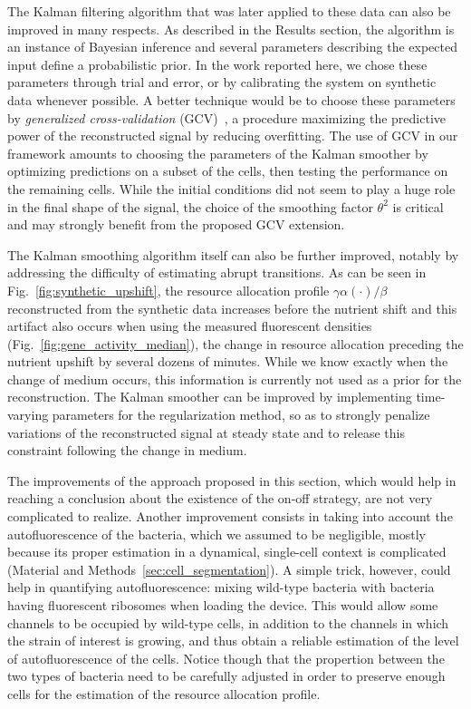 The Kalman filtering algorithm that was later applied to these data can also be improved in many respects.
As described in the Results section, the algorithm is an instance of Bayesian inference and several parameters describing the expected input define a probabilistic prior.
In the work reported here, we chose these parameters through trial and error, or by calibrating the system on synthetic data whenever possible.
A better technique would be to choose these parameters by \textit{generalized cross-validation} (GCV)~\cite{golub_generalized_1979}, a procedure maximizing the predictive power of the reconstructed signal by reducing overfitting.
The use of GCV in our framework amounts to choosing the parameters of the Kalman smoother by optimizing predictions on a subset of the cells, then testing the performance on the remaining cells.
While the initial conditions did not seem to play a huge role in the final shape of the signal, the choice of the smoothing factor $\theta^2$ is critical and may strongly benefit from the proposed GCV extension.

The Kalman smoothing algorithm itself can also be further improved, notably by addressing the difficulty of estimating abrupt transitions.
As can be seen in Fig.~\ref{fig:synthetic_upshift}, the resource allocation profile $\gamma \alpha (\cdot) / \beta$ reconstructed from the synthetic data increases before the nutrient shift and this artifact also occurs when using the measured fluorescent densities (Fig.~\ref{fig:gene_activity_median}), the change in resource allocation preceding the nutrient upshift by several dozens of minutes.
While we know exactly when the change of medium occurs, this information is currently not used as a prior for the reconstruction.
The Kalman smoother can be improved by implementing time-varying parameters for the regularization method, so as to strongly penalize variations of the reconstructed signal at steady state and to release this constraint following the change in medium.

The improvements of the approach proposed in this section, which would help in reaching a conclusion about the existence of the on-off strategy, are not very complicated to realize.
Another improvement consists in taking into account the autofluorescence of the bacteria, which we assumed to be negligible, mostly because its proper estimation in a dynamical, single-cell context is complicated (Material and Methods~\ref{sec:cell_segmentation}).
A simple trick, however, could help in quantifying autofluorescence: mixing wild-type bacteria with bacteria having fluorescent ribosomes when loading the device.
This would allow some channels to be occupied by wild-type cells, in addition to the  channels in which the strain of interest is growing, and thus obtain a reliable estimation of the level of autofluorescence of the cells.
Notice though that the propertion between the two types of bacteria need to be carefully adjusted in order to preserve enough cells for the estimation of the resource allocation profile. 

